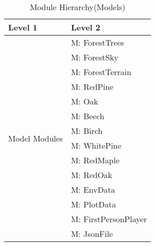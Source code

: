 \documentclass[12pt, titlepage]{article}
\newcounter{mnum}
\newcommand{\mthemnum}{M\themnum}
\begin{document}
\begin{table}[H]
\caption{Module Hierarchy(Models)}
\label{TblModels}

\centering
\begin{tabular}{p{} p{}}
\toprule
\textbf{Level 1} & \textbf{Level 2}\\
\midrule

\multirow{14}{0.3\textwidth}{Model Modules}
& {mnum} \mthemnum \label{Model1}: ForestTrees \\
& {mnum} \mthemnum \label{Model2}: ForestSky  \\
& {mnum} \mthemnum \label{Model3}: ForestTerrain \\
& {mnum} \mthemnum \label{Model4}: RedPine  \\
& {mnum} \mthemnum \label{Model5}: Oak   \\
& {mnum} \mthemnum \label{Model6}: Beech  \\
& {mnum} \mthemnum \label{Model7}: Birch  \\ 
& {mnum} \mthemnum \label{Model8}: WhitePine  \\
& {mnum} \mthemnum \label{Model9}: RedMaple \\
& {mnum} \mthemnum \label{Model10}: RedOak  \\
& {mnum} \mthemnum \label{Model11}: EnvData  \\
& {mnum} \mthemnum \label{Model12}: PlotData  \\
& {mnum} \mthemnum \label{Model13}: FirstPersonPlayer  \\
& {mnum} \mthemnum \label{Model14}: JsonFile  \\
\bottomrule

\end{tabular}

\end{table}


\newpage
\end{document}
